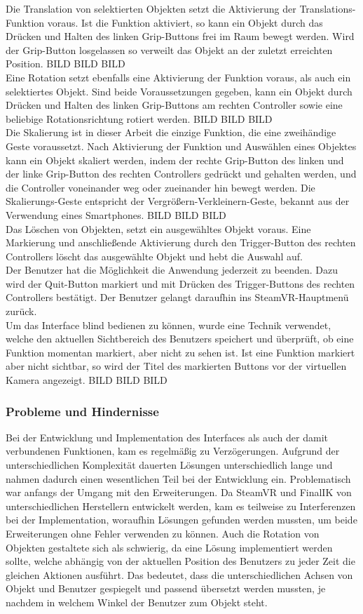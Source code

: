 Die Translation von selektierten Objekten setzt die Aktivierung der Translations-Funktion voraus. Ist die Funktion aktiviert, so kann ein Objekt durch das Drücken und Halten des linken Grip-Buttons frei im Raum bewegt werden. Wird der Grip-Button losgelassen so verweilt das Objekt an der zuletzt erreichten Position.
BILD BILD BILD\\
Eine Rotation setzt ebenfalls eine Aktivierung der Funktion voraus, als auch ein selektiertes Objekt. Sind beide Voraussetzungen gegeben, kann ein Objekt durch Drücken und Halten des linken Grip-Buttons am rechten Controller sowie eine beliebige Rotationsrichtung rotiert werden.
BILD BILD BILD\\
Die Skalierung ist in dieser Arbeit die einzige Funktion, die eine zweihändige Geste voraussetzt. Nach Aktivierung der Funktion und Auswählen eines Objektes kann ein Objekt skaliert werden, indem der rechte Grip-Button des linken und der linke Grip-Button des rechten Controllers gedrückt und gehalten werden, und die Controller voneinander weg oder zueinander hin bewegt werden. Die Skalierungs-Geste entspricht der Vergrößern-Verkleinern-Geste, bekannt aus der Verwendung eines Smartphones.
BILD BILD BILD\\
Das Löschen von Objekten, setzt ein ausgewähltes Objekt voraus. Eine Markierung und anschließende Aktivierung durch den Trigger-Button des rechten Controllers löscht das ausgewählte Objekt und hebt die Auswahl auf.\\
Der Benutzer hat die Möglichkeit die Anwendung jederzeit zu beenden. Dazu wird der Quit-Button markiert und mit Drücken des Trigger-Buttons des rechten Controllers bestätigt. Der Benutzer gelangt daraufhin ins SteamVR-Hauptmenü zurück.\\
Um das Interface blind bedienen zu können, wurde eine Technik verwendet, welche den aktuellen Sichtbereich des Benutzers speichert und überprüft, ob eine Funktion momentan markiert, aber nicht zu sehen ist. Ist eine Funktion markiert aber nicht sichtbar, so wird der Titel des markierten Buttons vor der virtuellen Kamera angezeigt.
BILD BILD BILD

\subsubsection{Probleme und Hindernisse}
Bei der Entwicklung und Implementation des Interfaces als auch der damit verbundenen Funktionen, kam es regelmäßig zu Verzögerungen.  Aufgrund der unterschiedlichen Komplexität dauerten Lösungen unterschiedlich lange und nahmen dadurch einen wesentlichen Teil bei der Entwicklung ein. Problematisch war anfangs der Umgang mit den Erweiterungen. Da SteamVR und FinalIK von unterschiedlichen Herstellern entwickelt werden, kam es teilweise zu Interferenzen bei der Implementation, woraufhin Lösungen gefunden werden mussten, um beide Erweiterungen ohne Fehler verwenden zu können. Auch die Rotation von Objekten gestaltete sich als schwierig, da eine Lösung implementiert werden sollte, welche abhängig von der aktuellen Position des Benutzers zu jeder Zeit die gleichen Aktionen ausführt. Das bedeutet, dass die unterschiedlichen Achsen von Objekt und Benutzer gespiegelt und passend übersetzt werden mussten, je nachdem in welchem Winkel der Benutzer zum Objekt steht.

